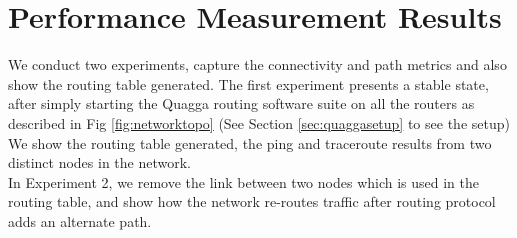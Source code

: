 \documentclass{article}
\begin{document}
\section{Performance Measurement Results}
We conduct two experiments, capture the connectivity and path metrics and also show the routing table generated.
The first experiment presents a stable state, after simply starting the Quagga routing software suite on all the routers as described in
Fig \ref{fig:networktopo} (See Section \ref{sec:quaggasetup} to see the setup)
We show the routing table generated, the ping and traceroute results from two distinct nodes in the network.\\
In Experiment 2, we remove the link between two nodes which is used in the routing table, and show how the network re-routes traffic 
after routing protocol adds an alternate path.
\end{document}
